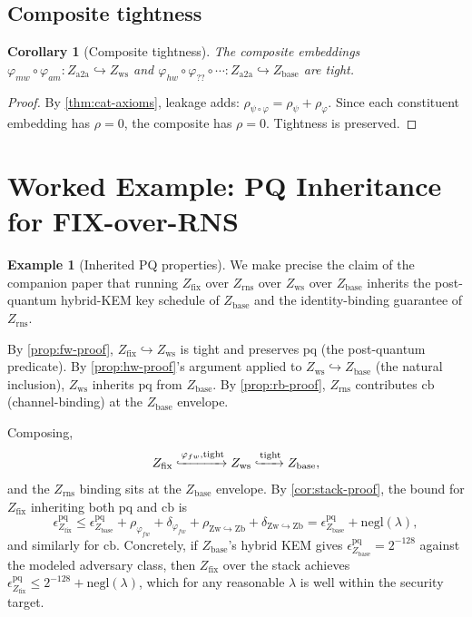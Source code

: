 \documentclass[11pt]{article}
\newtheorem{corollary}[theorem]{Corollary}
\theoremstyle{definition}
\newtheorem{example}[theorem]{Example}
\theoremstyle{remark}
\newcommand{\Zb}{Z_{\mathrm{base}}}
\newcommand{\Zw}{Z_{\mathrm{ws}}}
\newcommand{\Zf}{Z_{\mathrm{fix}}}
\newcommand{\Zr}{Z_{\mathrm{rns}}}
\newcommand{\Za}{Z_{\mathrm{a2a}}}
\begin{document}
\subsection{Composite tightness}

\begin{corollary}[Composite tightness]
\label{cor:composite-tight}
The composite embeddings $\varphi_{mw} \circ \varphi_{am} : \Za
\hookrightarrow \Zw$ and $\varphi_{hw} \circ \varphi_{??} \circ
\cdots : \Za \hookrightarrow \Zb$ are tight.
\end{corollary}

\begin{proof}
By \cref{thm:cat-axioms}, leakage adds: $\rho_{\psi \circ \varphi}
= \rho_\psi + \rho_\varphi$. Since each constituent embedding has
$\rho = 0$, the composite has $\rho = 0$. Tightness is preserved.
\end{proof}

\section{Worked Example: PQ Inheritance for FIX-over-RNS}
\label{sec:fix-rns-example}

\begin{example}[Inherited PQ properties]
\label{ex:fix-rns-pq}
We make precise the claim of the companion paper that running $\Zf$
over $\Zr$ over $\Zw$ over $\Zb$ inherits the post-quantum
hybrid-KEM key schedule of $\Zb$ and the identity-binding guarantee
of $\Zr$.

By \cref{prop:fw-proof}, $\Zf \hookrightarrow \Zw$ is tight and
preserves $\mathrm{pq}$ (the post-quantum predicate). By
\cref{prop:hw-proof}'s argument applied to $\Zw \hookrightarrow
\Zb$ (the natural inclusion), $\Zw$ inherits $\mathrm{pq}$ from
$\Zb$. By \cref{prop:rb-proof}, $\Zr$ contributes $\mathrm{cb}$
(channel-binding) at the $\Zb$ envelope.

Composing,
\[
\Zf \xhookrightarrow{\varphi_{fw}, \mathrm{tight}} \Zw
\xhookrightarrow{\mathrm{tight}} \Zb,
\]
and the $\Zr$ binding sits at the $\Zb$ envelope. By
\cref{cor:stack-proof}, the bound for $\Zf$ inheriting both
$\mathrm{pq}$ and $\mathrm{cb}$ is
\[
\epsilon_{\Zf}^{\mathrm{pq}} \le \epsilon_{\Zb}^{\mathrm{pq}} +
\rho_{\varphi_{fw}} + \delta_{\varphi_{fw}} +
\rho_{\mathrm{Zw \hookrightarrow Zb}} + \delta_{\mathrm{Zw
\hookrightarrow Zb}} = \epsilon_{\Zb}^{\mathrm{pq}} +
\mathrm{negl}(\lambda),
\]
and similarly for $\mathrm{cb}$. Concretely, if $\Zb$'s hybrid KEM
gives $\epsilon_{\Zb}^{\mathrm{pq}} = 2^{-128}$ against the
modeled adversary class, then $\Zf$ over the stack achieves
$\epsilon_{\Zf}^{\mathrm{pq}} \le 2^{-128} + \mathrm{negl}(\lambda)$,
which for any reasonable $\lambda$ is well within the security
target.
\end{example}
\end{document}
